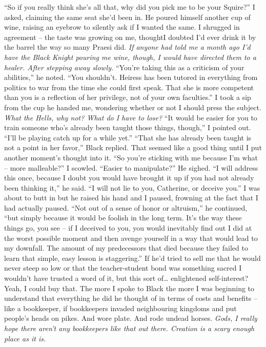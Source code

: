 \documentclass[12pt, openany]{book}
\begin{document}
“So if you really think she’s all that, why did you pick me to be your Squire?” I asked, claiming the same seat she’d been in.
He poured himself another cup of wine, raising an eyebrow to silently ask if I wanted the same. I shrugged in agreement – the taste was growing on me, thoughtI doubted I’d ever drink it by the barrel the way so many Praesi did. \textit{If anyone had told me a month ago I’d have the Black Knight pouring me wine, though, I would have directed them to a healer. After stepping away slowly.}
“You’re taking this as a criticism of your abilities,” he noted. “You shouldn’t. Heiress has been tutored in everything from politics to war from the time she could first speak. That she is more competent than you is a reflection of her privilege, not of your own faculties.”
I took a sip from the cup he handed me, wondering whether or not I should press the subject. \textit{What the Hells, why not? What do I have to lose?}
“It would be easier for you to train someone who’s already been taught those things, though,” I pointed out. “I’ll be playing catch up for a while yet.”
“That she has already been taught is not a point in her favor,” Black replied.
That seemed like a good thing until I put another moment’s thought into it.
“So you’re sticking with me because I’m what – more malleable?” I scowled. “Easier to manipulate?”
He sighed.
“I will address this once, because I doubt you would have brought it up if you had not already been thinking it,” he said. “I will not lie to you, Catherine, or deceive you.”
I was about to butt in but he raised his hand and I paused, frowning at the fact that I had actually paused.
“Not out of a sense of honor or altruism,” he continued, “but simply because it would be foolish in the long term. It’s the way these things go, you see – if I deceived to you, you would inevitably find out I did at the worst possible moment and then avenge yourself in a way that would lead to my downfall. The amount of my predecessors that died because they failed to learn that simple, easy lesson is staggering.”
If he’d tried to sell me that he would never steep so low or that the teacher-student bond was something sacred I wouldn’t have trusted a word of it, but this sort of… enlightened self-interest? Yeah, I could buy that. The more I spoke to Black the more I was beginning to understand that everything he did he thought of in terms of costs and benefits – like a bookkeeper, if bookkeepers invaded neighbouring kingdoms and put people’s heads on pikes. And wore plate. And rode undead horses. \textit{Gods, I really hope there aren’t any bookkeepers like that out there. Creation is a scary enough place as it is.}
\end{document}
